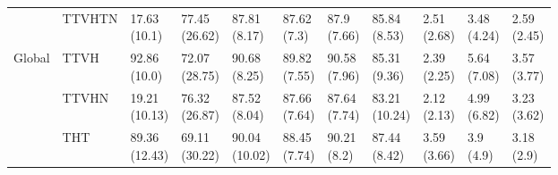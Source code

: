 \begin{table}
\begin{tabular}{lllllllllll}
       & TTVHTN &   \makecell{17.63\\(10.1)} &  \makecell{77.45\\(26.62)} &   \makecell{87.81\\(8.17)} &   \makecell{87.62\\(7.3)} &   \makecell{87.9\\(7.66)} &   \makecell{85.84\\(8.53)} &      \makecell{2.51\\(2.68)} &  \makecell{3.48\\(4.24)} &  \makecell{2.59\\(2.45)} \\
Global & TTVH &   \makecell{92.86\\(10.0)} &  \makecell{72.07\\(28.75)} &   \makecell{90.68\\(8.25)} &  \makecell{89.82\\(7.55)} &  \makecell{90.58\\(7.96)} &   \makecell{85.31\\(9.36)} &      \makecell{2.39\\(2.25)} &  \makecell{5.64\\(7.08)} &  \makecell{3.57\\(3.77)} \\
       & TTVHN &  \makecell{19.21\\(10.13)} &  \makecell{76.32\\(26.87)} &   \makecell{87.52\\(8.04)} &  \makecell{87.66\\(7.64)} &  \makecell{87.64\\(7.74)} &  \makecell{83.21\\(10.24)} &      \makecell{2.12\\(2.13)} &  \makecell{4.99\\(6.82)} &  \makecell{3.23\\(3.62)} \\
       & THT &  \makecell{89.36\\(12.43)} &  \makecell{69.11\\(30.22)} &  \makecell{90.04\\(10.02)} &  \makecell{88.45\\(7.74)} &   \makecell{90.21\\(8.2)} &   \makecell{87.44\\(8.42)} &      \makecell{3.59\\(3.66)} &    \makecell{3.9\\(4.9)} &   \makecell{3.18\\(2.9)} \\

\end{tabular}
\end{table}
